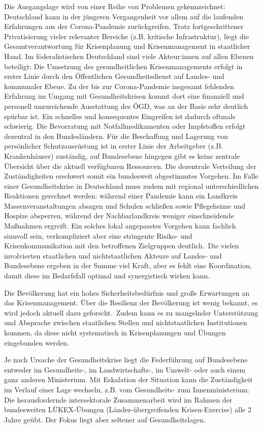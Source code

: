 \documentclass{article}
\begin{document}
Die Ausgangslage wird von einer Reihe von Problemen gekennzeichnet: Deutschland kann in der jüngeren Vergangenheit vor allem auf die laufenden Erfahrungen aus der Corona-Pandemie zurückgreifen. Trotz fortgeschrittener Privatisierung vieler relevanter Bereiche (z.B. kritische Infrastruktur), liegt die Gesamtverantwortung für Krisenplanung und Krisenmanagement in staatlicher Hand. Im föderalistischen Deutschland sind viele Akteur:innen auf allen Ebenen beteiligt: Die Umsetzung des gesundheitlichen Krisenmanagements erfolgt in erster Linie durch den Öffentlichen Gesundheitsdienst auf Landes- und kommunaler Ebene. Zu der bis zur Corona-Pandemie insgesamt fehlenden Erfahrung im Umgang mit Gesundheitskrisen kommt dort eine finanziell und personell unzureichende Ausstattung des ÖGD, was an der Basis sehr deutlich spürbar ist. Ein schnelles und konsequentes Eingreifen ist dadurch oftmals schwierig. Die Bevorratung mit Notfallmedikamenten oder Impfstoffen erfolgt dezentral in den Bundesländern. Für die Beschaffung und Lagerung von persönlicher Schutzausrüstung ist in erster Linie der Arbeitgeber (z.B. Krankenhäuser) zuständig, auf Bundesebene hingegen gibt es keine zentrale Übersicht über die aktuell verfügbaren Ressourcen. Die dezentrale Verteilung der Zuständigkeiten erschwert somit ein bundesweit abgestimmtes Vorgehen. Im Falle einer Gesundheitskrise in Deutschland muss zudem mit regional unterschiedlichen Reaktionen gerechnet werden: während einer Pandemie kann ein Landkreis Massenveranstaltungen absagen und Schulen schließen sowie Pflegeheime und Hospize absperren, während der Nachbarlandkreis weniger einschneidende Maßnahmen ergreift. Ein solches lokal angepasstes Vorgehen kann fachlich sinnvoll sein, verkompliziert aber eine stringente Risiko- und Krisenkommunikation mit den betroffenen Zielgruppen deutlich. Die vielen involvierten staatlichen und nichtstaatlichen Akteure auf Landes‐ und Bundesebene ergeben in der Summe viel Kraft, aber es fehlt eine Koordination, damit diese im Bedarfsfall optimal und synergistisch wirken kann.


Die Bevölkerung hat ein hohes Sicherheitsbedürfnis und große Erwartungen an das Krisenmanagement. Über die Resilienz der Bevölkerung ist wenig bekannt, es wird jedoch aktuell dazu geforscht. Zudem kann es zu mangelnder Unterstützung und Absprache zwischen staatlichen Stellen und nichtstaatlichen Institutionen kommen, da diese nicht systematisch in Krisenplanungen und Übungen eingebunden werden.  


Je nach Ursache der Gesundheitskrise liegt die Federführung auf Bundesebene entweder im Gesundheits-, im Landwirtschafts-, im Umwelt- oder auch einem ganz anderen Ministerium. Mit Eskalation der Situation kann die Zuständigkeit im Verlauf einer Lage wechseln, z.B. vom Gesundheits- zum Innenministerium. Die herausfordernde intersektorale Zusammenarbeit wird im Rahmen der bundesweiten LÜKEX-Übungen (Länder-übergreifenden Krisen-Exercise) alle 2 Jahre geübt. Der Fokus liegt aber seltener auf Gesundheitslagen. 
\end{document}
